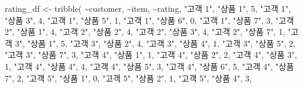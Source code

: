 \documentclass[
]{book}
\newenvironment{Shaded}{\begin{snugshade}}{\end{snugshade}}
\newcommand{\DecValTok}[1]{\textcolor[rgb]{0.00,0.00,0.81}{#1}}
\newcommand{\FunctionTok}[1]{\textcolor[rgb]{0.00,0.00,0.00}{#1}}
\newcommand{\NormalTok}[1]{#1}
\newcommand{\OtherTok}[1]{\textcolor[rgb]{0.56,0.35,0.01}{#1}}
\newcommand{\SpecialCharTok}[1]{\textcolor[rgb]{0.00,0.00,0.00}{#1}}
\newcommand{\StringTok}[1]{\textcolor[rgb]{0.31,0.60,0.02}{#1}}
\begin{document}
\begin{Shaded}
\begin{Highlighting}[]
\NormalTok{rating\_df }\OtherTok{\textless{}{-}} \FunctionTok{tribble}\NormalTok{(}
  \SpecialCharTok{\textasciitilde{}}\NormalTok{customer, }\SpecialCharTok{\textasciitilde{}}\NormalTok{item, }\SpecialCharTok{\textasciitilde{}}\NormalTok{rating,}
  \StringTok{"고객 1"}\NormalTok{, }\StringTok{"상품 1"}\NormalTok{, }\DecValTok{5}\NormalTok{,}
  \StringTok{"고객 1"}\NormalTok{, }\StringTok{"상품 3"}\NormalTok{, }\DecValTok{4}\NormalTok{,}
  \StringTok{"고객 1"}\NormalTok{, }\StringTok{"상품 5"}\NormalTok{, }\DecValTok{1}\NormalTok{,}
  \StringTok{"고객 1"}\NormalTok{, }\StringTok{"상품 6"}\NormalTok{, }\DecValTok{0}\NormalTok{,}
  \StringTok{"고객 1"}\NormalTok{, }\StringTok{"상품 7"}\NormalTok{, }\DecValTok{3}\NormalTok{,}
  \StringTok{"고객 2"}\NormalTok{, }\StringTok{"상품 1"}\NormalTok{, }\DecValTok{4}\NormalTok{,}
  \StringTok{"고객 2"}\NormalTok{, }\StringTok{"상품 2"}\NormalTok{, }\DecValTok{4}\NormalTok{,}
  \StringTok{"고객 2"}\NormalTok{, }\StringTok{"상품 3"}\NormalTok{, }\DecValTok{4}\NormalTok{,}
  \StringTok{"고객 2"}\NormalTok{, }\StringTok{"상품 7"}\NormalTok{, }\DecValTok{1}\NormalTok{,}
  \StringTok{"고객 3"}\NormalTok{, }\StringTok{"상품 1"}\NormalTok{, }\DecValTok{5}\NormalTok{,}
  \StringTok{"고객 3"}\NormalTok{, }\StringTok{"상품 2"}\NormalTok{, }\DecValTok{4}\NormalTok{,}
  \StringTok{"고객 3"}\NormalTok{, }\StringTok{"상품 4"}\NormalTok{, }\DecValTok{1}\NormalTok{,}
  \StringTok{"고객 3"}\NormalTok{, }\StringTok{"상품 5"}\NormalTok{, }\DecValTok{2}\NormalTok{,}
  \StringTok{"고객 3"}\NormalTok{, }\StringTok{"상품 7"}\NormalTok{, }\DecValTok{3}\NormalTok{,}
  \StringTok{"고객 4"}\NormalTok{, }\StringTok{"상품 1"}\NormalTok{, }\DecValTok{1}\NormalTok{,}
  \StringTok{"고객 4"}\NormalTok{, }\StringTok{"상품 2"}\NormalTok{, }\DecValTok{2}\NormalTok{,}
  \StringTok{"고객 4"}\NormalTok{, }\StringTok{"상품 3"}\NormalTok{, }\DecValTok{1}\NormalTok{,}
  \StringTok{"고객 4"}\NormalTok{, }\StringTok{"상품 4"}\NormalTok{, }\DecValTok{4}\NormalTok{,}
  \StringTok{"고객 4"}\NormalTok{, }\StringTok{"상품 5"}\NormalTok{, }\DecValTok{3}\NormalTok{,}
  \StringTok{"고객 4"}\NormalTok{, }\StringTok{"상품 6"}\NormalTok{, }\DecValTok{5}\NormalTok{,}
  \StringTok{"고객 4"}\NormalTok{, }\StringTok{"상품 7"}\NormalTok{, }\DecValTok{2}\NormalTok{,}
  \StringTok{"고객 5"}\NormalTok{, }\StringTok{"상품 1"}\NormalTok{, }\DecValTok{0}\NormalTok{,}
  \StringTok{"고객 5"}\NormalTok{, }\StringTok{"상품 2"}\NormalTok{, }\DecValTok{1}\NormalTok{,}
  \StringTok{"고객 5"}\NormalTok{, }\StringTok{"상품 4"}\NormalTok{, }\DecValTok{3}\NormalTok{,}

\end{Highlighting}
\end{Shaded}
\end{document}
